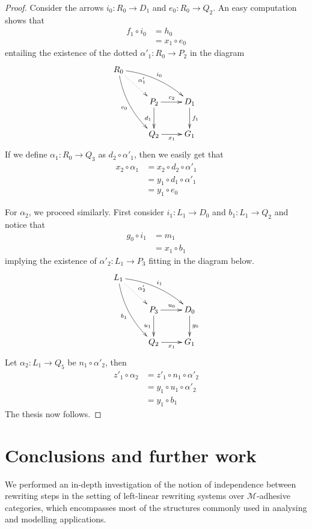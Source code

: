 \documentclass[a4paper,UKenglish,cleveref,pdftex,thm-restate,numberwithinsect]{lipics-v2021}
\begin{document}
\begin{proof}
		Consider the arrows $i_0\colon R_0\to D_1$ and $e_0\colon R_0\to Q_2$. An easy computation shows that
		\begin{align*}
			f_1\circ i_0 & = h_0 \\&=x_1\circ e_0
		\end{align*}
		entailing the existence of  the dotted $\alpha'_1\colon R_0\to P_2$ in the diagram
		\[\xymatrix{R_0 \ar@{.>}[dr]^{\alpha'_1} \ar@/^.3cm/[drr]^{i_0} \ar@/_.3cm/[ddr]_{e_0}\\ &P_2 \ar[r]^{c_2} \ar[d]_{d_1}& D_1 \ar[d]^{f_1}\\ &Q_2\ar[r]_{x_1} & G_1}\]
		If we define $\alpha_1\colon R_0\to Q_3$ as $d_2\circ \alpha'_1$, then we easily get that
		\begin{align*}
			x_2\circ \alpha_1 & =x_2\circ d_2\circ \alpha'_1 \\&= y_1\circ d_1\circ \alpha'_1\\&=y_1\circ e_0
		\end{align*}

		For $\alpha_2$, we proceed similarly. First consider  $i_1\colon L_1\to D_0$ and $b_1\colon L_1 \to Q_2$ and notice that
		\begin{align*}
			g_0\circ i_1 & = m_1 \\&= x_1 \circ b_1
		\end{align*}
		implying the existence of $\alpha'_2\colon L_1\to P_3$ fitting in the diagram below.
		\[\xymatrix{L_1 \ar@{.>}[dr]^{\alpha'_2} \ar@/^.3cm/[drr]^{i_1} \ar@/_.3cm/[ddr]_{b_1}\\ &P_3 \ar[r]^{u_0} \ar[d]_{u_1}& D_0 \ar[d]^{g_0}\\ &Q_2\ar[r]_{x_1} & G_1}\]
		Let $\alpha_2\colon L_1\to Q_5$ be $n_1\circ \alpha'_2$, then
		\begin{align*}
			z'_1 \circ \alpha_2 & = z'_1 \circ n_1\circ \alpha'_2 \\&=y_1\circ u_1\circ \alpha'_2\\&=y_1\circ b_1
		\end{align*}
		The thesis now follows.
	\end{proof}
\fi





\section{Conclusions and further work}
\label{conclusions}

We performed an in-depth investigation of the notion of independence between
rewriting steps in the setting of left-linear rewriting systems
over $\mathcal{M}$-adhesive categories, which encompasses most of the
structures commonly used in analysing and modelling applications.
\end{document}
